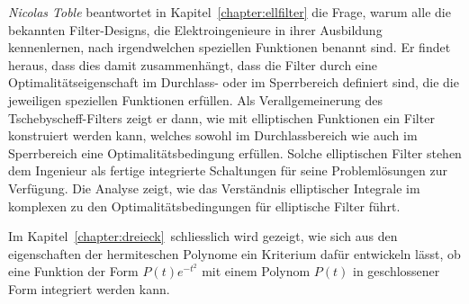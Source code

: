 {\em Nicolas Toble}
%
%
beantwortet in Kapitel~\ref{chapter:ellfilter} die Frage,
warum alle die bekannten Filter-Designs, die Elektroingenieure in
ihrer Ausbildung kennenlernen, nach irgendwelchen speziellen Funktionen
benannt sind.
Er findet heraus, dass dies damit zusammenhängt, dass die Filter
durch eine Optimalitätseigenschaft im Durchlass- oder im Sperrbereich
definiert sind, die die jeweiligen speziellen Funktionen erfüllen.
Als Verallgemeinerung des Tschebyscheff-Filters zeigt er dann, wie
mit elliptischen Funktionen ein Filter konstruiert werden kann,
welches sowohl im Durchlassbereich wie auch im Sperrbereich eine 
Optimalitätsbedingung erfüllen.
Solche elliptischen Filter stehen dem Ingenieur als fertige integrierte
Schaltungen für seine Problemlösungen zur Verfügung.
Die Analyse zeigt, wie das Verständnis elliptischer Integrale 
im komplexen zu den Optimalitätsbedingungen für elliptische
Filter führt.

Im Kapitel~\ref{chapter:dreieck} schliesslich wird gezeigt,
wie sich aus den eigenschaften der hermiteschen Polynome
ein Kriterium dafür entwickeln lässt, ob eine Funktion der Form
$P(t)e^{-t^2}$ mit einem Polynom $P(t)$ in geschlossener Form
integriert werden kann.
